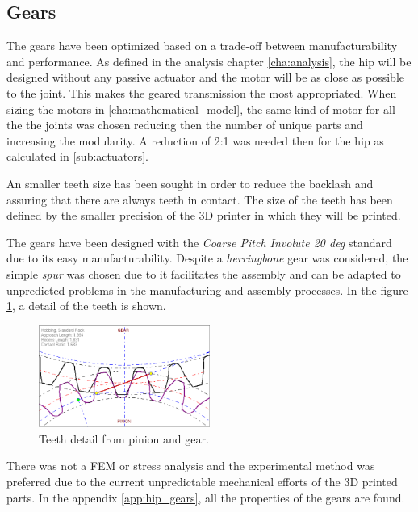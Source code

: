 \subsection{Gears} %
\label{sub:gears}
The gears have been optimized based on a trade-off between manufacturability and performance.
As defined in the analysis chapter \ref{cha:analysis}, the hip will be designed without any passive actuator and the motor will be as close as possible to the joint.
This makes the geared transmission the most appropriated.
When sizing the motors in \ref{cha:mathematical_model}, the same kind of motor for all the the joints was chosen reducing then the number of unique parts and increasing the modularity.
A reduction of 2:1 was needed then for the hip as calculated in \ref{sub:actuators}.

An smaller teeth size has been sought in order to reduce the backlash and assuring that there are always teeth in contact.
The size of the teeth has been defined by the smaller precision of the 3D printer in which they will be printed.

The gears have been designed with the \textit{Coarse Pitch Involute 20 deg} standard due to its easy manufacturability.
Despite a \textit{herringbone} gear was considered, the simple \textit{spur} was chosen due to it facilitates the assembly and can be adapted to unpredicted problems in the manufacturing and assembly processes. 
In the figure \ref{fig:teeth_detail}, a detail of the teeth is shown.

\begin{figure}[ht!]
  \centering
  \includegraphics[width=0.5\textwidth]{figures/hip_gears}
  \caption{Teeth detail from pinion and gear.}
  \label{fig:teeth_detail}
\end{figure}

There was not a FEM or stress analysis and the experimental method was preferred due to the current unpredictable mechanical efforts of the 3D printed parts.
In the appendix \ref{app:hip_gears}, all the properties of the gears are found.

